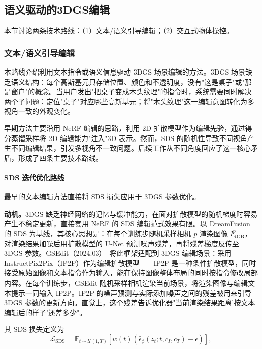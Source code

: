 \subsection{语义驱动的3DGS编辑}
\label{ss:09_1}

本节讨论两条技术路线：（1）文本/语义引导编辑；（2）交互式物体操控。

\subsubsection{文本/语义引导编辑}

本路线介绍利用文本指令或语义信息驱动 3DGS 场景编辑的方法。3DGS 场景缺乏语义结构：每个高斯基元只存储位置、颜色和不透明度，没有"这是桌子"或"那是窗户"的概念。当用户发出"把桌子变成木头纹理"的指令时，系统需要同时解决两个子问题：定位"桌子"对应哪些高斯基元；将"木头纹理"这一编辑意图转化为多视角一致的外观变化。

早期方法主要沿用 NeRF 编辑的思路，利用 2D 扩散模型作为编辑先验，通过得分蒸馏采样将 2D 编辑能力"注入"3D 表示。然而，SDS 的随机性导致不同视角产生不同编辑结果，引发多视角不一致问题。后续工作从不同角度回应了这一核心矛盾，形成了四条主要技术路线。

\paragraph{SDS 迭代优化路线}

最早的文本编辑方法直接将 SDS 损失应用于 3DGS 参数优化。

\textbf{动机。}3DGS 缺乏神经网络的记忆与缓冲能力，在面对扩散模型的随机梯度时容易产生不稳定更新，直接套用 NeRF 的 SDS 编辑范式效果有限。以 DreamFusion 的 SDS 为基线，其核心思想是：在每个训练步随机采样相机 $p$ 渲染图像 $I^p_{\text{RGB}}$，对渲染结果加噪后用扩散模型的 U-Net 预测噪声残差，再将残差梯度反传至 3DGS 参数。GSEdit（2024.03）~\cite{2403_05154}将此框架适配到 3DGS 编辑场景：采用 InstructPix2Pix（IP2P）作为编辑扩散模型——IP2P 是一种条件扩散模型，同时接受原始图像和文本指令作为输入，能在保持图像整体布局的同时按指令修改局部内容。在每个训练步，GSEdit 随机采样相机渲染当前场景，将渲染图像与编辑文本提示一同输入 IP2P。IP2P 的噪声预测与实际添加噪声之间的残差被用来引导 3DGS 参数的更新方向。直觉上，这个残差告诉优化器"当前渲染结果距离'按文本编辑后的样子'还差多少"。

其 SDS 损失定义为
\begin{equation}
  \mathcal{L}_{\text{SDS}} = \mathbb{E}_{t \sim \mathcal{U}(1,T)} \left[ w(t) \left( \hat{\epsilon}_\phi(z_t; t, c_I, c_T) - \epsilon \right) \right],
\end{equation}

